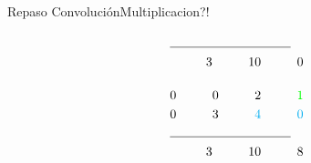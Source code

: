\begin{frame}{Repaso Convolución}{Multiplicacion?!}
\begin{columns}[t]
\begin{column}{.3\textwidth}
\begin{align*}
               \cline{1-2}
               3\hspace{1cm} 10\hspace{1cm}0\\[0.4cm]
               0\hspace{1cm} 0\hspace{1cm}                 2 \hspace{1cm}\textcolor{green}{1}\\
               0\hspace{1cm} 3\hspace{1cm}\textcolor{cyan}{4}\hspace{1cm}\textcolor{cyan} {0}\\
               \cline{1-2}
               3 \hspace{1cm} 10 \hspace{1cm} 8\\
            \end{align*}
      \end{column}
      \hspace{2pt}
   \end{columns}
   \vfill
\end{frame}

